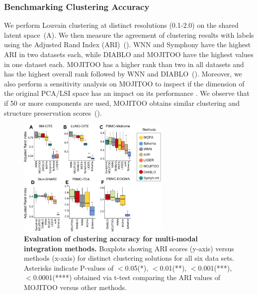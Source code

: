 \subsubsection{Benchmarking Clustering Accuracy}
We perform Louvain clustering at distinct resolutions (0.1-2.0) on the shared latent space~(A). We then measure the agreement of clustering results with labels using the Adjusted Rand Index (ARI)~(). WNN and Symphony have the highest ARI in two datasets each, while DIABLO and MOJITOO have the highest values in one dataset each. MOJITOO has a higher rank than two in all datasets and has the highest overall rank followed by WNN and DIABLO~(). Moreover, we also perform a sensitivity analysis on MOJITOO to inspect if the dimension of the original PCA/LSI space has an impact on its performance . We observe that if 50 or more components are used, MOJITOO obtains similar clustering and structure preservation scores~().
\begin{figure}[!ht]
	\centering
	\includegraphics[width=0.65\textwidth]{ari/fig}
	\vspace{0.1cm}
	\caption[Evaluation of clustering accuracy for multi-modal integration methods.]{
	\textbf{Evaluation of clustering accuracy for multi-modal integration methods.} Boxplots showing ARI scores (y-axis) versus methods (x-axis) for distinct clustering solutions for all six data sets. Asterisks indicate P-values of $<$0.05(*), $<$0.01(**), $<$0.001(***), $<$0.0001(****) obtained via t-test comparing the ARI values of MOJITOO versus other methods. }
	\label{fig:ari}
\end{figure}

